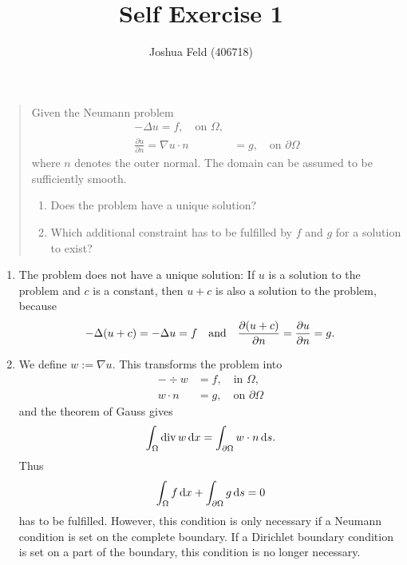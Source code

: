 \documentclass[english]{exercise}
\title{Self Exercise 1}
\author{Joshua Feld (406718)}
\begin{document}
	\maketitle


	\section{}

	\begin{quote}
		Given the Neumann problem
		\begin{align*}
			-\Delta u = f, \quad \text{on }\Omega,\\
			\frac{\partial u}{\partial n} = \nabla u \cdot n &= g, \quad \text{on }\partial\Omega
		\end{align*}
		where \(n\) denotes the outer normal.
		The domain can be assumed to be sufficiently smooth.
		\begin{enumerate}
			\item Does the problem have a unique solution?
			\item Which additional constraint has to be fulfilled by \(f\) and \(g\) for a solution to exist?
		\end{enumerate}
	\end{quote}

	\begin{enumerate}
		\item The problem does not have a unique solution:
		If \(u\) is a solution to the problem and \(c\) is a constant, then \(u + c\) is also a solution to the problem, because
		\[
			-\Delta\parentheses*{u + c} = -\Delta u = f \quad \text{and} \quad \frac{\partial\parentheses*{u + c}}{\partial n} = \frac{\partial u}{\partial n} = g.
		\]
		\item We define \(w := \nabla u\).
		This transforms the problem into
		\begin{align*}
			-\div w &= f, \quad \text{in }\Omega,\\
			w \cdot n &= g, \quad \text{on }\partial\Omega
		\end{align*}
		and the theorem of Gauss gives
		\[
			\int_\Omega \operatorname{div} w\mathop{\mathrm{d}\!} x = \int_{\partial\Omega}w \cdot n\mathop{\mathrm{d}\!} s.
		\]
		Thus
		\[
			\int_\Omega f\mathop{\mathrm{d}\!} x + \int_{\partial\Omega}g\mathop{\mathrm{d}\!} s = 0
		\]
		has to be fulfilled.
		However, this condition is only necessary if a Neumann condition is set on the complete boundary.
		If a Dirichlet boundary condition is set on a part of the boundary, this condition is no longer necessary.
	\end{enumerate}
\end{document}

